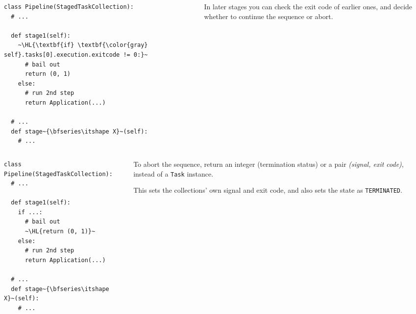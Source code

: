 \documentclass[english,serif,mathserif,xcolor=pdftex,dvipsnames,table]{beamer}
\begin{document}
\begin{frame}[fragile]
  \begin{columns}[c]
    \begin{column}{0.6\textwidth}
      \begin{lstlisting}[basicstyle=\footnotesize\ttfamily]
class Pipeline(StagedTaskCollection):
  # ...

  def stage1(self):
    ~\HL{\textbf{if} \textbf{\color{gray} self}.tasks[0].execution.exitcode != 0:}~
      # bail out
      return (0, 1)
    else:
      # run 2nd step
      return Application(...)

  # ...
  def stage~{\bfseries\itshape X}~(self):
    # ...
      \end{lstlisting}
    \end{column}
    \begin{column}{0.4\textwidth}
      \raggedleft

      \+\+\+\+\+
      In later stages you can check the exit code of
      earlier ones, and decide whether to continue the sequence or
      abort.
    \end{column}
  \end{columns}
\end{frame}


\begin{frame}[fragile]
  \begin{columns}[c]
    \begin{column}{0.6\textwidth}
      \begin{lstlisting}[basicstyle=\footnotesize\ttfamily]
class Pipeline(StagedTaskCollection):
  # ...

  def stage1(self):
    if ...:
      # bail out
      ~\HL{return (0, 1)}~
    else:
      # run 2nd step
      return Application(...)

  # ...
  def stage~{\bfseries\itshape X}~(self):
    # ...
      \end{lstlisting}
    \end{column}
    \begin{column}{0.4\textwidth}
      \raggedleft

      \+\+\+\+\+
      To abort the sequence, return an integer (termination
      status) or a pair \emph{(signal, exit code)}, instead of a
      \texttt{Task} instance.

      \+
      This sets the collections' own signal and exit code, and also sets the
      state as \texttt{TERMINATED}.
    \end{column}
  \end{columns}
\end{frame}
\end{document}
